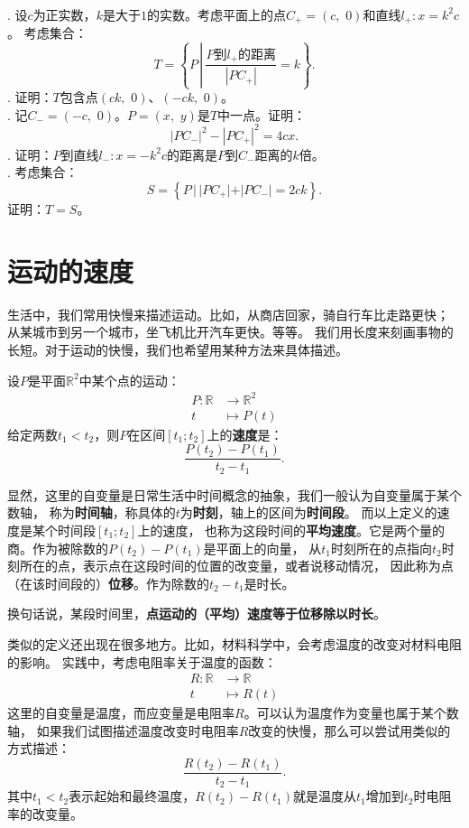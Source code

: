 \documentclass[12pt,UTF8,fontset=none]{ctexbook}
\begin{document}
\begin{xt}
    \mbox{} \\
    . 设$c$为正实数，$k$是大于$1$的实数。考虑平面上的点$C_+ = (c,\,\, 0)$和直线$l_+ : x = k^2c$。
    考虑集合：
    $$T = \left\{P\,\left| \, \frac{P\mbox{到}l_+\mbox{的距离}}{|PC_+|} = k\right.\right\}.$$
    . 证明：$T$包含点$(ck, \,\,0)$、$(-ck,\,\,0)$。\\
    . 记$C_- = (-c,\,\,0)$。$P = (x,\,\, y)$是$T$中一点。证明：
    $$ |PC_-|^2 - |PC_+|^2 = 4cx.$$
    . 证明：$P$到直线$l_-: x = -k^2c$的距离是$P$到$C_-$距离的$k$倍。\\
    . 考虑集合：
    $$ S = \left\{P\,| \, |PC_+| + |PC_-| = 2ck\right\}.$$
    证明：$T = S$。
\end{xt}

\section{运动的速度}
生活中，我们常用快慢来描述运动。比如，从商店回家，骑自行车比走路更快；
从某城市到另一个城市，坐飞机比开汽车更快。等等。
我们用长度来刻画事物的长短。对于运动的快慢，我们也希望用某种方法来具体描述。

\begin{df}
    设$P$是平面$\mathbb{R}^2$中某个点的运动：
    \begin{align*}
        P: \mathbb{R} &\rightarrow \mathbb{R}^2  \\
             t \, &\mapsto P(t) 
    \end{align*}
    给定两数$t_1 < t_2$，则$P$在区间$[t_1;t_2]$上的\textbf{速度}是：
    $$ \frac{P(t_2) - P(t_1)}{t_2 - t_1}.$$
\end{df}
显然，这里的自变量是日常生活中时间概念的抽象，我们一般认为自变量属于某个数轴，
称为\textbf{时间轴}，称具体的$t$为\textbf{时刻}，轴上的区间为\textbf{时间段}。
而以上定义的速度是某个时间段$[t_1;t_2]$上的速度，
也称为这段时间的\textbf{平均速度}。它是两个量的商。作为被除数的$P(t_2) - P(t_1)$是平面上的向量，
从$t_1$时刻所在的点指向$t_2$时刻所在的点，表示点在这段时间的位置的改变量，或者说移动情况，
因此称为点（在该时间段的）\textbf{位移}。作为除数的$t_2 - t_1$是时长。

换句话说，某段时间里，\textbf{点运动的（平均）速度等于位移除以时长}。

类似的定义还出现在很多地方。比如，材料科学中，会考虑温度的改变对材料电阻的影响。
实践中，考虑电阻率关于温度的函数：
\begin{align*}
    R: \mathbb{R} &\rightarrow \mathbb{R}  \\
         t \, &\mapsto R(t) 
\end{align*}
这里的自变量是温度，而应变量是电阻率$R$。可以认为温度作为变量也属于某个数轴，
如果我们试图描述温度改变时电阻率$R$改变的快慢，那么可以尝试用类似的方式描述：
$$ \frac{R(t_2) - R(t_1)}{t_2 - t_1}.$$
其中$t_1 < t_2$表示起始和最终温度，$R(t_2) - R(t_1)$就是温度从$t_1$增加到$t_2$时电阻率的改变量。
\end{document}
